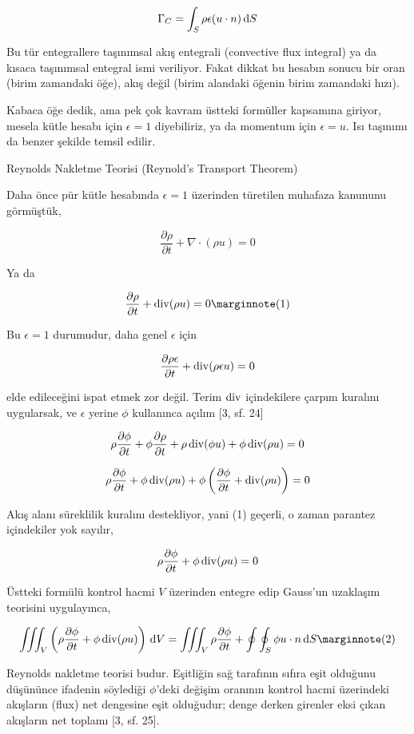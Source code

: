 \documentclass[12pt,fleqn]{article}\usepackage{../../common}
\begin{document}
$$
\Gamma_C = \int_S \rho \epsilon (u \cdot n) \,\mathrm{d} S
$$

Bu tür entegrallere taşınımsal akış entegrali (convective flux integral) ya da
kısaca taşınımsal entegral ismi veriliyor. Fakat dikkat bu hesabın sonucu bir
oran (birim zamandaki öğe), akış değil (birim alandaki öğenin birim zamandaki
hızı).

Kabaca öğe dedik, ama pek çok kavram üstteki formüller kapsamına giriyor, mesela
kütle hesabı için $\epsilon = 1$ diyebiliriz, ya da momentum için
$\epsilon = u$. Isı taşınımı da benzer şekilde temsil edilir.

Reynolds Nakletme Teorisi (Reynold's Transport Theorem)

Daha önce pür kütle hesabında $\epsilon = 1$ üzerinden türetilen muhafaza
kanununu görmüştük,

$$
\frac{\partial \rho}{\partial t} + \nabla \cdot (\rho u ) = 0
$$

Ya da 

$$
\frac{\partial \rho}{\partial t} + \bdiv (\rho u ) = 0
\mlabel{1}
$$

Bu $\epsilon = 1$ durumudur, daha genel $\epsilon$ için

$$
\frac{\partial \rho \epsilon}{\partial t} + \operatorname{div} (\rho \epsilon u ) = 0
$$

elde edileceğini ispat etmek zor değil. Terim $\operatorname{div}$ içindekilere çarpım
kuralını uygularsak, ve $\epsilon$ yerine $\phi$ kullanınca açılım [3, sf. 24]

$$
\rho \frac{\partial \phi}{\partial t} +
\phi \frac{\partial \rho}{\partial t} + 
\rho \operatorname{div} (\phi u ) +
\phi \operatorname{div} (\rho u ) = 0
$$

$$
\rho \frac{\partial \phi}{\partial t} +
\phi \operatorname{div} (\rho u ) +
\phi \left(
  \frac{\partial \phi}{\partial t} + \operatorname{div} (\rho u ) 
\right) = 0
$$

Akış alanı süreklilik kuralını destekliyor, yani (1) geçerli, o zaman
parantez içindekiler yok sayılır,

$$
\rho \frac{\partial \phi}{\partial t} + \phi \operatorname{div} (\rho u ) = 0
$$

Üstteki formülü kontrol hacmi $V$ üzerinden entegre edip Gauss'un uzaklaşım
teorisini uygulayınca,

$$
\iiint_V \left(
\rho \frac{\partial \phi}{\partial t} + \phi \bdiv (\rho u )
\right) \ud V =
\iiint_V \rho \frac{\partial \phi}{\partial t} +
\oint \oint_S \phi u \cdot n \ud S
\mlabel{2}
$$

Reynolds nakletme teorisi budur. Eşitliğin sağ tarafının sıfıra eşit olduğunu
düşününce ifadenin söylediği $\phi$'deki değişim oranının kontrol hacmi
üzerindeki akışların (flux) net dengesine eşit olduğudur; denge derken girenler
eksi çıkan akışların net toplamı [3, sf. 25].
\end{document}
